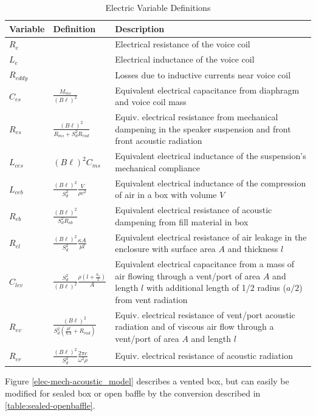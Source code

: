 \documentclass[10pt,letterpaper]{article}
\begin{document}
\begin{table}
\centering
\renewcommand{\arraystretch}{1.5}
\begin{tabularx}{\textwidth}{@{} ll X @{}}
\toprule
Variable & Definition & Description \\
\midrule
$R_e$ & & Electrical resistance of the voice coil\\
$L_e$ & & Electrical inductance of the voice coil\\
$R_{eddy}$ & & Losses due to inductive currents near voice coil\\
$C_{es}$ & $\frac{M_{ms}}{(B\ell)^2}$ & Equivalent electrical capacitance from diaphragm and voice coil mass\\
$R_{es}$ & $\frac{(B\ell)^2}{R_{ms}+S_d^2R_{rad}}$ & Equiv. electrical resistance from mechanical dampening in the speaker suspension and front front acoustic radiation\\
$L_{ces}$ & $(B\ell)^2C_{ms}$ & Equivalent electrical inductance of the suspension's mechanical compliance\\
$L_{ceb}$ & $\frac{(B\ell)^2}{S_d^2} \frac{V}{\rho c^2}$ & Equivalent electrical inductance of the compression of air in a box with volume $V$\\
$R_{eb}$ & $\frac{(B\ell)^2}{S_d^2 R_{ab}}$ & Equivalent electrical resistance of acoustic dampening from fill material in box\\
$R_{el}$ & $\frac{(B\ell)^2}{S_d^2 } \frac{\kappa A}{\mu l}$ & Equivalent electrical resistance of air leakage in the enclosure with surface area $A$ and thickness $l$\\
$C_{lev}$ & $\frac{S_d^2}{(B\ell)^2}\frac{\rho \left(l+\frac{a_v}{2}\right)}{A}$ & Equivalent electrical capacitance from a mass of air flowing through a vent/port of area $A$ and length $l$ with additional length of 1/2 radius ($a/2$) from vent radiation\\
$R_{ev}$ & $\frac{(B\ell)^2}{S_d^2\left( \frac{\mu l}{\kappa A}+R_{rad}\right)}$ & Equiv. electrical resistance of vent/port acoustic radiation and of viscous air flow through a vent/port of area $A$ and length $l$\\
$R_{er}$ & $\frac{(B\ell)^2}{S_d^2}\frac{2\pi c}{\omega^2 \rho}$& Equiv. electrical resistance of acoustic radiation\\
\bottomrule
\end{tabularx}
\caption{Electric Variable Definitions}\label{table:variables}
\end{table}

Figure \ref{elec-mech-acoustic_model} describes a vented box, but can easily be modified for sealed box or open baffle by the conversion described in \ref{table:sealed-openbaffle}.
\end{document}
